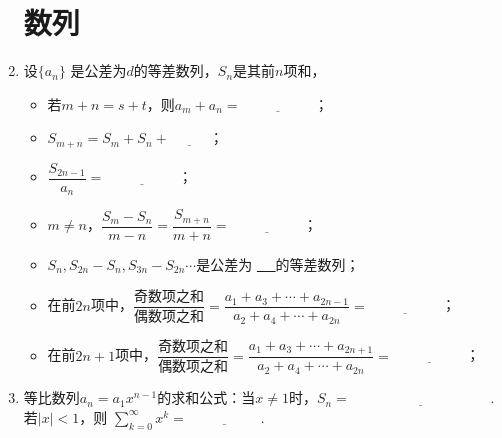 \documentclass{article}
\newif\ifte
\begin{document}
\begin{multicols}{2}
\begin{enumerate}[leftmargin=20pt]
\section{数列}
\item 设$ \{a_n \} $ 是公差为$ d $的等差数列，$ S_n $是其前$ n $项和，
\begin{itemize}[leftmargin=-4pt]
\item 若$ m+n=s+t $，则$ a_m+a_n=\underline{\ \ifte 
    a_s+a_t\else \hspace{2cm} \fi\ } $；
\item $ S_{m+n}=S_m+S_n+\underline{\ \ifte mnd
    \else \hspace{1cm} \fi\ } $；
\item $ \dfrac{S_{2n-1}}{a_n}=\underline{\ \ifte 2n-1
    \else \hspace{2cm} \fi\ } $；
\item $ m\neq n $，$ \dfrac{S_m-S_n}{m-n}=\dfrac{S_{m+n}}{m+n}=
    \underline{\ \ifte \dfrac{d}{2}(m+n)+(a_1-\dfrac{d}{2})
    \else \hspace{2cm} \fi\ } $；
\item $ S_n,S_{2n}-S_n,S_{3n}-S_{2n} \cdots $是公差为
\underline{\ \ifte $ n^2d $\else \hspace{0.5cm} \fi\ }的等差数列；
\item 在前$ 2n $项中，$ \dfrac{\text{奇数项之和}}{\text{偶数项之和}}=
\dfrac{a_1+a_3+\cdots+a_{2n-1}}{a_2+a_4+\cdots+a_{2n}}=
\underline{\ \ifte \dfrac{a_n}{a_{n+1}} \else \hspace{2cm} \fi\ } $；
\item 在前$ 2n+1 $项中，$ \dfrac{\text{奇数项之和}}{\text{偶数项之和}}=
\dfrac{a_1+a_3+\cdots+a_{2n+1}}{a_2+a_4+\cdots+a_{2n}}=
\underline{\ \ifte \dfrac{n+1}{n} \else \hspace{2cm} \fi\ } $；
\end{itemize}

\item 等比数列$ a_n=a_1x^{n-1} $的求和公式：当$ x\neq 1 $时，$ S_n=
\underline{\ \ifte \dfrac{a_1(1-x^n)}{1-x}=\dfrac{a_1-a_{n+1}}{1-x}
    \else \hspace{4cm} \fi\ } $. 若$ |x|<1 $，则
$ \sum\limits_{k=0}^{\infty} x^{k}=\underline{\ \ifte 
    \dfrac{1}{1-x}\else \hspace{2cm} \fi\ } $.


\end{enumerate}
\end{multicols}
\end{document}
